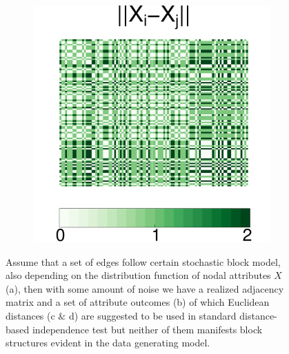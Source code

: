 \documentclass[12pt]{article}
\theoremstyle{definition}
\begin{document}
\begin{figure}[H]
\begin{subfigure}[b]{0.23\textwidth}
			\caption{}
		\label{fig:c}
	\end{subfigure}
		\begin{subfigure}[b]{0.23\textwidth}
			\includegraphics[width=\textwidth]{../Figure/distX.pdf}
				\caption{}
			\label{fig:d}
		\end{subfigure}
	\caption{Assume that a set of edges follow certain stochastic block model, also depending on the distribution function of nodal attributes $X$ (a), then with some amount of noise we have a realized adjacency matrix and a set of attribute outcomes (b) of which Euclidean distances (c $\&$ d) are suggested to be used in standard distance-based independence test but neither of them manifests block structures evident in the data generating model.}
	\label{fig:matrics}
\end{figure}
\end{document}
